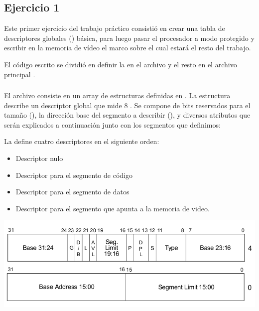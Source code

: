 \subsection{Ejercicio 1}
	Este primer ejercicio del trabajo práctico consistió en crear una tabla de descriptores globales () básica, para luego pasar el 
procesador a modo protegido y escribir en la memoria de vídeo el marco sobre el cual estará el resto del trabajo.

 	El código escrito se dividió en definir la  en el archivo  y el resto en el archivo principal .

\subsubsection{}
	El archivo consiste en un array de estructuras  definidas en . La estructura describe un descriptor global 
que mide 8 .
	Se compone de bits reservados para el tamaño (), la dirección base del segmento a describir (), y diversos atributos 
que serán explicados a continuación junto con los segmentos que definimos:

\noindent La  define cuatro descriptores en el siguiente orden:
\begin{itemize}
	\item Descriptor nulo
	\item Descriptor para el segmento de código
	\item Descriptor para el segmento de datos
	\item Descriptor para el segmento que apunta a la memoria de video.
\end{itemize}

\begin{center}
\includegraphics[scale=0.3]{gdt_descriptor.png}
\end{center}

